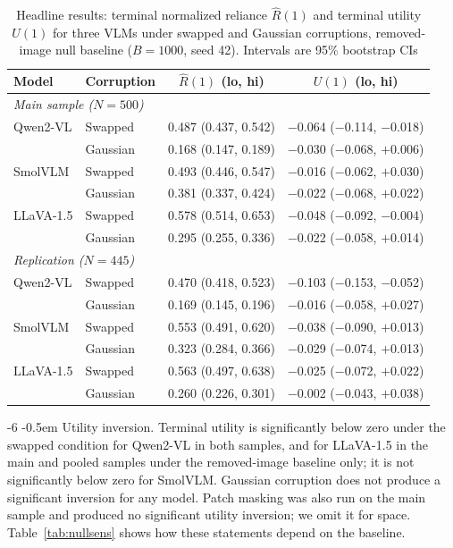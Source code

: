 \documentclass[graybox]{svmult}
\makeatletter
\renewcommand\paragraph{\@startsection{paragraph}{4}{\z@}%
  {-6\p@ \@plus -2\p@ \@minus -2\p@}%
  {-0.5em}%
  {\normalfont\normalsize\bfseries}}
\makeatother
\begin{document}
\begin{table}[tb]
\centering
\caption{Headline results: terminal normalized reliance $\hat{R}(1)$ and
  terminal utility $U(1)$ for three VLMs under swapped and Gaussian
  corruptions, removed-image null baseline ($B=1000$, seed 42).
  Intervals are 95\% bootstrap CIs}
\label{tab:headline}
{\footnotesize\setlength{\tabcolsep}{3pt}%
\begin{tabular}{llcc}
\toprule
\textbf{Model} & \textbf{Corruption} & $\hat{R}(1)$ (lo, hi) & $U(1)$ (lo, hi) \\
\midrule
\multicolumn{4}{l}{\textit{Main sample ($N=500$)}} \\
\midrule
Qwen2-VL  & Swapped  & 0.487 (0.437, 0.542) & $-$0.064 ($-$0.114, $-$0.018) \\
          & Gaussian & 0.168 (0.147, 0.189) & $-$0.030 ($-$0.068, $+$0.006) \\
SmolVLM   & Swapped  & 0.493 (0.446, 0.547) & $-$0.016 ($-$0.062, $+$0.030) \\
          & Gaussian & 0.381 (0.337, 0.424) & $-$0.022 ($-$0.068, $+$0.022) \\
LLaVA-1.5 & Swapped  & 0.578 (0.514, 0.653) & $-$0.048 ($-$0.092, $-$0.004) \\
           & Gaussian & 0.295 (0.255, 0.336) & $-$0.022 ($-$0.058, $+$0.014) \\
\midrule
\multicolumn{4}{l}{\textit{Replication ($N=445$)}} \\
\midrule
Qwen2-VL  & Swapped  & 0.470 (0.418, 0.523) & $-$0.103 ($-$0.153, $-$0.052) \\
          & Gaussian & 0.169 (0.145, 0.196) & $-$0.016 ($-$0.058, $+$0.027) \\
SmolVLM   & Swapped  & 0.553 (0.491, 0.620) & $-$0.038 ($-$0.090, $+$0.013) \\
          & Gaussian & 0.323 (0.284, 0.366) & $-$0.029 ($-$0.074, $+$0.013) \\
LLaVA-1.5 & Swapped  & 0.563 (0.497, 0.638) & $-$0.025 ($-$0.072, $+$0.022) \\
           & Gaussian & 0.260 (0.226, 0.301) & $-$0.002 ($-$0.043, $+$0.038) \\
\bottomrule
\end{tabular}}
\end{table}


\paragraph{Utility inversion.}
Terminal utility is significantly below zero under the swapped condition
for Qwen2-VL in both samples, and for LLaVA-1.5 in the main and pooled
samples under the removed-image baseline only; it is not significantly below
zero for SmolVLM. Gaussian corruption does not produce a significant
inversion for any model. Patch masking was also run on the main sample and
produced no significant utility inversion; we omit it for space.
Table~\ref{tab:nullsens} shows how these statements depend on the baseline.
\end{document}
